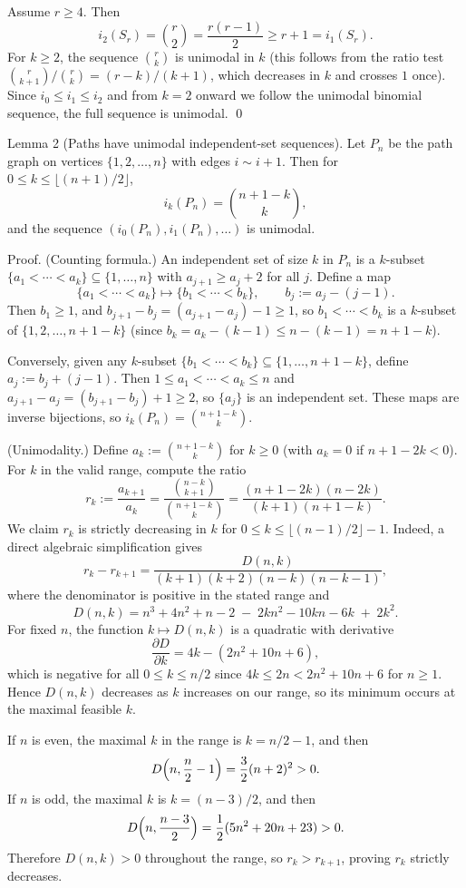 Assume $r\ge 4$.  Then
\[
 i_2(S_r)=\binom{r}{2}=\frac{r(r-1)}{2} \ge r+1 = i_1(S_r).
\]
For $k\ge 2$, the sequence $\binom{r}{k}$ is unimodal in $k$ (this follows from the ratio test $\binom{r}{k+1}/\binom{r}{k}=(r-k)/(k+1)$, which decreases in $k$ and crosses $1$ once).  Since $i_0\le i_1\le i_2$ and from $k=2$ onward we follow the unimodal binomial sequence, the full sequence is unimodal.  \qed

Lemma 2 (Paths have unimodal independent-set sequences).
Let $P_n$ be the path graph on vertices $\{1,2,\dots,n\}$ with edges $i\sim i+1$.  Then for $0\le k\le \lfloor (n+1)/2\rfloor$,
\[
 i_k(P_n)=\binom{n+1-k}{k},
\]
and the sequence $(i_0(P_n),i_1(P_n),\dots)$ is unimodal.

Proof.
(Counting formula.)  An independent set of size $k$ in $P_n$ is a $k$-subset $\{a_1<\cdots<a_k\}\subseteq\{1,\dots,n\}$ with $a_{j+1}\ge a_j+2$ for all $j$.  Define a map
\[
\{a_1<\cdots<a_k\} \mapsto \{b_1<\cdots<b_k\},\qquad b_j:=a_j-(j-1).
\]
Then $b_1\ge 1$, and $b_{j+1}-b_j=(a_{j+1}-a_j)-1\ge 1$, so $b_1<\cdots<b_k$ is a $k$-subset of $\{1,2,\dots,n+1-k\}$ (since $b_k=a_k-(k-1)\le n-(k-1)=n+1-k$).

Conversely, given any $k$-subset $\{b_1<\cdots<b_k\}\subseteq\{1,\dots,n+1-k\}$, define $a_j:=b_j+(j-1)$.  Then $1\le a_1<\cdots<a_k\le n$ and $a_{j+1}-a_j=(b_{j+1}-b_j)+1\ge 2$, so $\{a_j\}$ is an independent set.  These maps are inverse bijections, so
$i_k(P_n)=\binom{n+1-k}{k}$.

(Unimodality.)  Define $a_k:=\binom{n+1-k}{k}$ for $k\ge 0$ (with $a_k=0$ if $n+1-2k<0$).  For $k$ in the valid range, compute the ratio
\[
 r_k:=\frac{a_{k+1}}{a_k} = \frac{\binom{n-k}{k+1}}{\binom{n+1-k}{k}}
 = \frac{(n+1-2k)(n-2k)}{(k+1)(n+1-k)}.
\]
We claim $r_k$ is strictly decreasing in $k$ for $0\le k\le \lfloor (n-1)/2\rfloor-1$.  Indeed, a direct algebraic simplification gives
\[
 r_k-r_{k+1} = \frac{D(n,k)}{(k+1)(k+2)(n-k)(n-k-1)},
\]
where the denominator is positive in the stated range and
\[
 D(n,k)=n^3+4n^2+n-2\; -\; 2k n^2 - 10k n - 6k\; +\; 2k^2.
\]
For fixed $n$, the function $k\mapsto D(n,k)$ is a quadratic with derivative
\[
 \frac{\partial D}{\partial k}=4k-(2n^2+10n+6),
\]
which is negative for all $0\le k\le n/2$ since $4k\le 2n<2n^2+10n+6$ for $n\ge 1$.  Hence $D(n,k)$ decreases as $k$ increases on our range, so its minimum occurs at the maximal feasible $k$.

If $n$ is even, the maximal $k$ in the range is $k=n/2-1$, and then
\[
 D\Bigl(n,\frac{n}{2}-1\Bigr)=\frac{3}{2}(n+2)^2>0.
\]
If $n$ is odd, the maximal $k$ is $k=(n-3)/2$, and then
\[
 D\Bigl(n,\frac{n-3}{2}\Bigr)=\frac{1}{2}(5n^2+20n+23)>0.
\]
Therefore $D(n,k)>0$ throughout the range, so $r_k>r_{k+1}$, proving $r_k$ strictly decreases.

